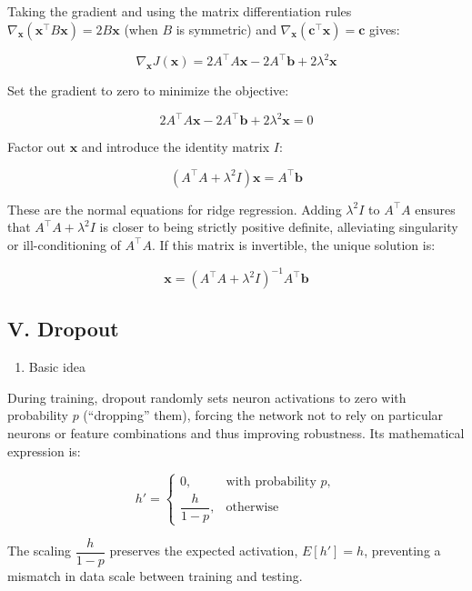 Taking the gradient and using the matrix differentiation rules \(\nabla_{\mathbf{x}}(\mathbf{x}^\top B\mathbf{x})=2B\mathbf{x}\) (when \(B\) is symmetric) and \(\nabla_{\mathbf{x}}(\mathbf{c}^\top\mathbf{x})=\mathbf{c}\) gives:

\[
\nabla_{\mathbf{x}}J(\mathbf{x})
=2A^\top A\mathbf{x}-2A^\top\mathbf{b}+2\lambda^2\mathbf{x}
\]

Set the gradient to zero to minimize the objective:

\[
2A^\top A\mathbf{x}-2A^\top\mathbf{b}+2\lambda^2\mathbf{x}=0
\]

Factor out \(\mathbf{x}\) and introduce the identity matrix \(I\):

\[
(A^\top A+\lambda^2I)\mathbf{x}=A^\top\mathbf{b}
\]

These are the normal equations for ridge regression. Adding \(\lambda^2I\) to \(A^\top A\) ensures that \(A^\top A+\lambda^2I\) is closer to being strictly positive definite, alleviating singularity or ill-conditioning of \(A^\top A\). If this matrix is invertible, the unique solution is:

\[
\mathbf{x}=(A^\top A+\lambda^2I)^{-1}A^\top\mathbf{b}
\]

\hypertarget{v.-dropout}{%
\subsection{V. Dropout}\label{v.-dropout}}

\begin{enumerate}
\def\labelenumi{\arabic{enumi}.}
\tightlist
\item
  Basic idea
\end{enumerate}

During training, dropout randomly sets neuron activations to zero with probability \(p\) (``dropping'' them), forcing the network not to rely on particular neurons or feature combinations and thus improving robustness. Its mathematical expression is:

\[
h'=
\begin{cases}
0, & \text{with probability }p,\\
\dfrac{h}{1-p}, & \text{otherwise}
\end{cases}
\]

The scaling \(\dfrac{h}{1-p}\) preserves the expected activation, \(E[h']=h\), preventing a mismatch in data scale between training and testing.

